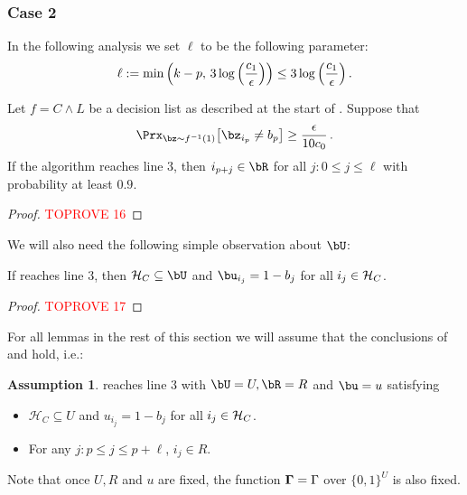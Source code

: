 \documentclass[11pt]{article}
\theoremstyle{definition}
\newtheorem{assumption}{Assumption}
\begin{document}
\subsubsection{Case 2}
\label{sec:case2}

In the following analysis we set $\ell$ to be the following parameter: 
$$
\ell:= \min\left(k -p,\hspace{0.06cm}3\log\left(\frac{c_1}{\epsilon}\right)\right)\le 3\log\left(\frac{c_1}{\epsilon}\right).$$
\begin{lemma}\label{lem: U and R are good}
    Let $f=C\land L$ be a decision list as described at the start of . Suppose that$$\Prx_{\bz \sim f^{-1}(1)}\big[\bz_{i_p} \neq b_p\big] \geq \frac{\epsilon}{10c_0}\,.$$
    If the algorithm reaches line $3$, then $i_{p+j}\in \bR$ for all $j:0\le j\le \ell$ with probability at least $0.9 $.
\end{lemma}
\begin{proof}\textcolor{red}{TOPROVE 16}\end{proof}

We will also need the following simple observation about $\bU$:
\begin{lemma}\label{lem: H is good}
    If  reaches line 3, then
    $\mathcal{H}_C\subseteq \bU$ and $\bu_{i_j}=1-b_{j}$ for all $i_j\in {\cal H}_C$.
\end{lemma}
\begin{proof}\textcolor{red}{TOPROVE 17}\end{proof}
     
For all lemmas in the rest of this section we will assume that the conclusions of  and  hold, i.e.:

\begin{assumption}\label{assumption: U R are good}
 reaches line 3 with $\bU=U,\bR=R$ and $\bu=u$ satisfying\begin{itemize}
        \item $\mathcal{H}_C \subseteq  U$ and $ u_{i_j}=1-b_{j}$ for all $i_j\in {\cal H}_C$.
        \item For any $j:p \leq j \leq  p+\ell$, $i_j \in  R$.
    \end{itemize}
Note that once $U,R$ and $u$ are fixed, 
  the function $\mathbf{\Gamma}=\Gamma$ over $\{0,1\}^U$ is also fixed. 
\end{assumption}
\end{document}

